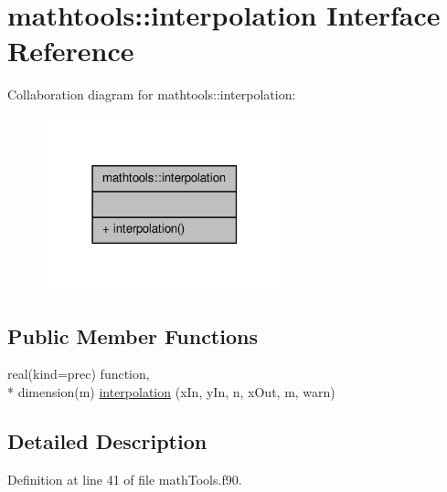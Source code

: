 \hypertarget{interfacemathtools_1_1interpolation}{\section{mathtools\-:\-:interpolation Interface Reference}
\label{interfacemathtools_1_1interpolation}
}


Collaboration diagram for mathtools\-:\-:interpolation\-:\nopagebreak
\begin{figure}[H]
\begin{center}
\leavevmode
\includegraphics[width=198pt]{interfacemathtools_1_1interpolation__coll__graph}
\end{center}
\end{figure}
\subsection*{Public Member Functions}
\begin{DoxyCompactItemize}
\item 
real(kind=prec) function, \\*
dimension(m) \hyperlink{interfacemathtools_1_1interpolation_a4b6ad870f4e5e805870157ad7d6d7baf}{interpolation} (x\-In, y\-In, n, x\-Out, m, warn)
\end{DoxyCompactItemize}


\subsection{Detailed Description}


Definition at line 41 of file math\-Tools.\-f90.



